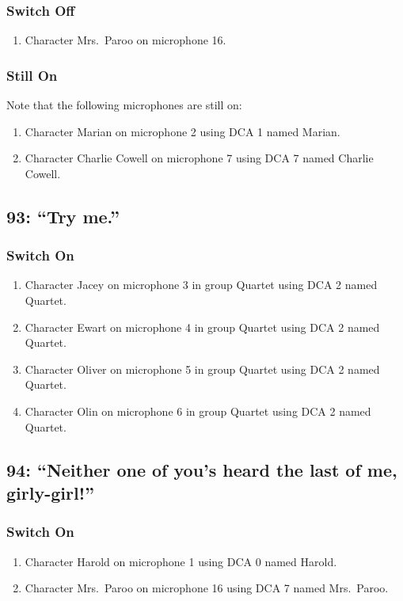 \subsubsection* {Switch Off}
\begin{enumerate}
\item Character Mrs.~Paroo on microphone 16.
\end{enumerate}
\subsubsection* {Still On}
Note that the following microphones are still on:
\begin{enumerate}
\item Character Marian on microphone 2 using DCA 1 named Marian.
\item Character Charlie Cowell on microphone 7 using DCA 7 named Charlie Cowell.
\end{enumerate}
\subsection* {93: ``Try me.''}
\subsubsection* {Switch On}
\begin{enumerate}
\item Character Jacey on microphone 3 in group Quartet using DCA 2 named Quartet.
\item Character Ewart on microphone 4 in group Quartet using DCA 2 named Quartet.
\item Character Oliver on microphone 5 in group Quartet using DCA 2 named Quartet.
\item Character Olin on microphone 6 in group Quartet using DCA 2 named Quartet.
\end{enumerate}
\subsection* {94: ``Neither one of you's heard the last of me, girly-girl!''}
\subsubsection* {Switch On}
\begin{enumerate}
\item Character Harold on microphone 1 using DCA 0 named Harold.
\item Character Mrs.~Paroo on microphone 16 using DCA 7 named Mrs.~Paroo.
\end{enumerate}

